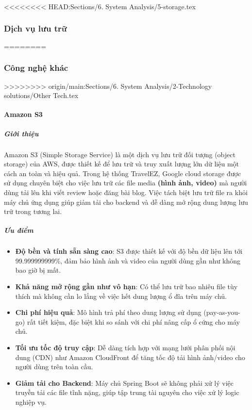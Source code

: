 <<<<<<<< HEAD:Sections/6. System Analysis/5-storage.tex
\subsubsection{Dịch vụ lưu trữ}
========

\subsubsection{Công nghệ khác}
>>>>>>>> origin/main:Sections/6. System Analysis/2-Technology solutions/Other Tech.tex

\paragraph{Amazon S3}

\subparagraph{Giới thiệu}
Amazon S3 (Simple Storage Service) là một dịch vụ lưu trữ đối tượng (object storage) của AWS, được thiết kế để lưu trữ và truy xuất lượng lớn dữ liệu một cách an toàn và hiệu quả. Trong hệ thống TravelEZ, Google cloud storage được sử dụng chuyên biệt cho việc lưu trữ các file media \textbf{(hình ảnh, video)} mà người dùng tải lên khi viết review hoặc đăng bài blog. Việc tách biệt lưu trữ file ra khỏi máy chủ ứng dụng giúp giảm tải cho backend và dễ dàng mở rộng dung lượng lưu trữ trong tương lai.

\subparagraph{Ưu điểm}
\begin{itemize}
    \item \textbf{Độ bền và tính sẵn sàng cao}: S3 được thiết kế với độ bền dữ liệu lên tới 99.999999999\%, đảm bảo hình ảnh và video của người dùng gần như không bao giờ bị mất.
    \item \textbf{Khả năng mở rộng gần như vô hạn}: Có thể lưu trữ bao nhiêu file tùy thích mà không cần lo lắng về việc hết dung lượng ổ đĩa trên máy chủ.
    \item \textbf{Chi phí hiệu quả}: Mô hình trả phí theo dung lượng sử dụng (pay-as-you-go) rất tiết kiệm, đặc biệt khi so sánh với chi phí nâng cấp ổ cứng cho máy chủ.
    \item \textbf{Tối ưu tốc độ truy cập}: Dễ dàng tích hợp với mạng lưới phân phối nội dung (CDN) như Amazon CloudFront để tăng tốc độ tải hình ảnh/video cho người dùng trên toàn cầu.
    \item \textbf{Giảm tải cho Backend}: Máy chủ Spring Boot sẽ không phải xử lý việc truyền tải các file tĩnh nặng, giúp tập trung tài nguyên cho việc xử lý logic nghiệp vụ.
\end{itemize}

